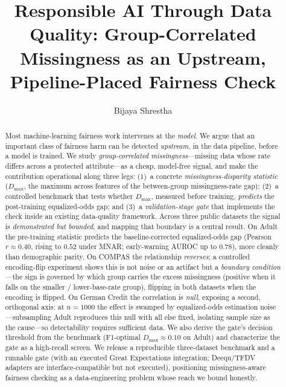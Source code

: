 \documentclass[sigconf,nonacm]{acmart}
\begin{document}
\title{Responsible AI Through Data Quality: Group-Correlated Missingness as an
Upstream, Pipeline-Placed Fairness Check}

\author{Bijaya Shrestha}

\renewcommand{\shortauthors}{Shrestha}

\begin{abstract}
Most machine-learning fairness work intervenes at the \emph{model}. We argue that an
important class of fairness harm can be detected \emph{upstream}, in the data pipeline,
before a model is trained. We study \emph{group-correlated missingness}---missing data whose
rate differs across a protected attribute---as a cheap, model-free signal, and make the
contribution operational along three legs: (1)~a concrete \emph{missingness-disparity
statistic} ($D_{\max}$, the maximum across features of the between-group missingness-rate
gap); (2)~a controlled benchmark that tests whether $D_{\max}$, measured before training,
\emph{predicts} the post-training equalized-odds gap; and (3)~a \emph{validation-stage gate}
that implements the check inside an existing data-quality framework. Across three public
datasets the signal is \emph{demonstrated but bounded}, and mapping that boundary is a central
result. On Adult the pre-training statistic predicts the baseline-corrected equalized-odds gap
(Pearson $r\approx0.40$, rising to $0.52$ under MNAR; early-warning AUROC up to $0.78$), more
cleanly than demographic parity. On COMPAS the relationship \emph{reverses}; a controlled
encoding-flip experiment shows this is not noise or an artifact but a \emph{boundary condition}
---the sign is governed by which group carries the excess missingness (positive when it falls on
the smaller / lower-base-rate group), flipping in both datasets when the encoding is flipped. On
German Credit the correlation is \emph{null}, exposing a second, orthogonal axis: at $n{=}1000$
the effect is swamped by equalized-odds estimation noise---subsampling Adult reproduces this null
with all else fixed, isolating sample size as the cause---so detectability requires sufficient
data. We also derive the gate's decision threshold from the benchmark (F1-optimal $D_{\max}\approx
0.10$ on Adult) and characterize the gate as a high-recall screen. We release a reproducible
three-dataset benchmark and a runnable gate (with an executed Great Expectations integration;
Deequ/TFDV adapters are interface-compatible but not executed), positioning missingness-aware
fairness checking as a data-engineering problem whose reach we bound honestly.
\end{abstract}
\end{document}
